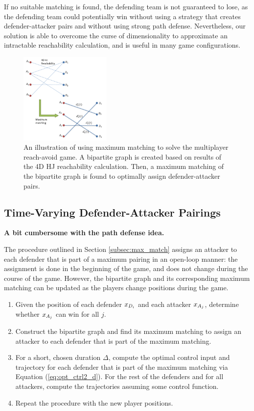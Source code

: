If no suitable matching is found, the defending team is not guaranteed to lose, as the defending team could potentially win without using a strategy that creates defender-attacker pairs and without using strong path defense. Nevertheless, our solution is able to overcome the curse of dimensionality to approximate an intractable reachability calculation, and is useful in many game configurations.

\begin{figure}[h]
\centering
\includegraphics[width=0.4\textwidth]{"fig/general procedure"}
\caption{An illustration of using maximum matching to solve the multiplayer reach-avoid game. A bipartite graph is created based on results of the 4D HJ reachability calculation. Then, a maximum matching of the bipartite graph is found to optimally assign defender-attacker pairs.}
\label{fig:general_procedure}
\end{figure}

\subsection{Time-Varying Defender-Attacker Pairings}
\label{subsec:tvarp}
\textbf{A bit cumbersome with the path defense idea.}

The procedure outlined in Section \ref{subsec:max_match} assigns an attacker to each defender that is part of a maximum pairing in an open-loop manner: the assignment is done in the beginning of the game, and does not change during the course of the game. However, the bipartite graph and its corresponding maximum matching can be updated as the players change positions during the game. 

\begin{enumerate}
\item Given the position of each defender $x_{D_{i}}$ and each attacker $x_{A_{j}}$, determine whether $x_{A_{j}}$ can win for all $j$. 
\item Construct the bipartite graph and find its maximum matching to assign an attacker to each defender that is part of the maximum matching.
\item For a short, chosen duration $\Delta$, compute the optimal control input and trajectory for each defender that is part of the maximum matching via Equation (\ref{eq:opt_ctrl2_d}). For the rest of the defenders and for all attackers, compute the trajectories assuming some control function.
\item Repeat the procedure with the new player positions.
\end{enumerate}

